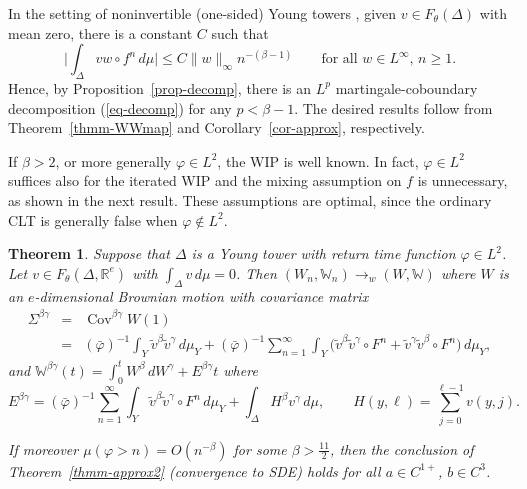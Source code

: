 \documentclass[aop,MSNbibl,seceqn,dvips]{arximspdf}
\newcommand{\eqref}[1]{(\ref{#1})}
\newtheorem{thmm}{Theorem}[section]
\newcommand{\R}{\mathbb{R}}
\newcommand{\BBW}{\mathbb{W}}
\newcommand{\Cov}{\operatorname{Cov}}
\newcommand{\tildev}{\tilde{v}}
\begin{document}
\begin{pf}
In the setting of noninvertible (one-sided) Young towers \cite{Young99},
given $v\in F_\theta(\Delta)$ with mean zero, there is a constant $C$
such that
%
\[
\biggl|\int_\Delta v w\circ f^n \,d\mu \biggr|\le C\|w
\|_\infty n^{-(\beta-1)}\qquad \mbox{for all $w\in L^\infty$, $n
\ge1$.}
\]
%
Hence, by Proposition~\ref{prop-decomp}, there is an $L^p$
martingale-coboundary decomposition \eqref{eq-decomp} for any $p<\beta-1$.
The desired results follow from Theorem~\ref{thmm-WWmap}
and Corollary~\ref{cor-approx}, respectively.
\end{pf}

If $\beta>2$, or more generally $\varphi\in L^2$, the WIP is well known.
In fact, $\varphi\in L^2$ suffices also for the iterated WIP and the
mixing assumption on $f$ is unnecessary, as shown in the next result.
These assumptions are optimal, since the ordinary CLT is generally
false when $\varphi\notin L^2$.

\begin{thmm} \label{thmm-Young2}
Suppose that $\Delta$ is a Young tower with return time function
$\varphi\in L^2$.
Let $v\in F_\theta(\Delta,\R^e)$ with $\int_\Delta v \,d\mu=0$. Then
$(W_n,\BBW_n)\to_w (W,\BBW)$ where $W$ is an $e$-dimensional
Brownian motion with covariance matrix
%
\begin{eqnarray*}
\Sigma^{\beta\gamma} & =&\Cov^{\beta\gamma}W(1)
\\
& =&(\bar\varphi)^{-1}\int_Y
\tildev^\beta\tildev^\gamma \,d\mu _Y+(\bar
\varphi)^{-1}\sum_{n=1}^\infty\int
_Y\bigl(\tildev^\beta\tildev^\gamma
\circ F^n+\tildev^\gamma\tildev^\beta\circ
F^n\bigr) \,d\mu_Y,
\end{eqnarray*}
%
and $\BBW^{\beta\gamma}(t)=\int_0^t W^\beta \,dW^\gamma+E^{\beta
\gamma
}t$ where
%
\[
E^{\beta\gamma}=(\bar\varphi)^{-1}\sum_{n=1}^\infty
\int_Y\tildev ^\beta \tildev^\gamma
\circ F^n \,d\mu_Y+\int_\Delta
H^\beta v^\gamma \,d\mu,\qquad H(y,\ell)=\sum
_{j=0}^{\ell-1} v(y,j).
\]

If moreover $\mu(\varphi>n)=O(n^{-\beta})$ for some $\beta>\frac{11}{2}$,
then the conclusion of Theorem~\ref{thmm-approx2} (convergence to SDE) holds
for all $a\in C^{1+}$, $b\in C^{3}$.
\end{thmm}
\end{document}

